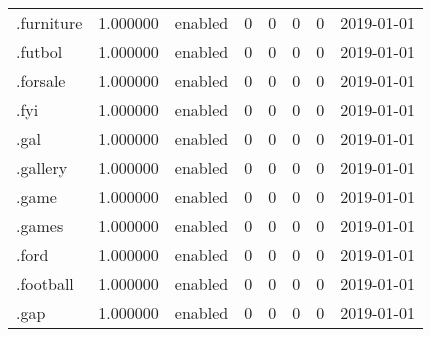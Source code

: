 \begin{tabular}{lrlrrrrl}
.furniture                &          1.000000 &         enabled &                           0 &                           0 &                           0 &                   0 &           2019-01-01 \\
.futbol                   &          1.000000 &         enabled &                           0 &                           0 &                           0 &                   0 &           2019-01-01 \\
.forsale                  &          1.000000 &         enabled &                           0 &                           0 &                           0 &                   0 &           2019-01-01 \\
.fyi                      &          1.000000 &         enabled &                           0 &                           0 &                           0 &                   0 &           2019-01-01 \\
.gal                      &          1.000000 &         enabled &                           0 &                           0 &                           0 &                   0 &           2019-01-01 \\
.gallery                  &          1.000000 &         enabled &                           0 &                           0 &                           0 &                   0 &           2019-01-01 \\
.game                     &          1.000000 &         enabled &                           0 &                           0 &                           0 &                   0 &           2019-01-01 \\
.games                    &          1.000000 &         enabled &                           0 &                           0 &                           0 &                   0 &           2019-01-01 \\
.ford                     &          1.000000 &         enabled &                           0 &                           0 &                           0 &                   0 &           2019-01-01 \\
.football                 &          1.000000 &         enabled &                           0 &                           0 &                           0 &                   0 &           2019-01-01 \\
.gap                      &          1.000000 &         enabled &                           0 &                           0 &                           0 &                   0 &           2019-01-01 \\

\end{tabular}
